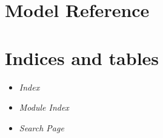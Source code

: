 \documentclass[letterpaper,10pt,english]{manual}
\begin{document}
\resetcurrentobjects
\hypertarget{--doc-reference/models}{}

\chapter{Model Reference}


\chapter{Indices and tables}
\begin{itemize}
\item {} 
\emph{Index}

\item {} 
\emph{Module Index}

\item {} 
\emph{Search Page}

\end{itemize}


\renewcommand{\indexname}{Module Index}
\printmodindex
\renewcommand{\indexname}{Index}
\printindex
\end{document}
